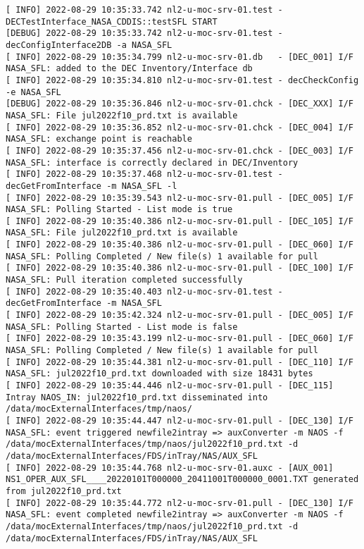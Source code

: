 \documentclass[dec_sum_main.tex]{subfiles}
\begin{document}
\begin{Verbatim}[fontsize=\tiny]
[ INFO] 2022-08-29 10:35:33.742 nl2-u-moc-srv-01.test - DECTestInterface_NASA_CDDIS::testSFL START
[DEBUG] 2022-08-29 10:35:33.742 nl2-u-moc-srv-01.test - decConfigInterface2DB -a NASA_SFL
[ INFO] 2022-08-29 10:35:34.799 nl2-u-moc-srv-01.db   - [DEC_001] I/F NASA_SFL: added to the DEC Inventory/Interface db
[ INFO] 2022-08-29 10:35:34.810 nl2-u-moc-srv-01.test - decCheckConfig -e NASA_SFL
[DEBUG] 2022-08-29 10:35:36.846 nl2-u-moc-srv-01.chck - [DEC_XXX] I/F NASA_SFL: File jul2022f10_prd.txt is available
[ INFO] 2022-08-29 10:35:36.852 nl2-u-moc-srv-01.chck - [DEC_004] I/F NASA_SFL: exchange point is reachable
[ INFO] 2022-08-29 10:35:37.456 nl2-u-moc-srv-01.chck - [DEC_003] I/F NASA_SFL: interface is correctly declared in DEC/Inventory
[ INFO] 2022-08-29 10:35:37.468 nl2-u-moc-srv-01.test - decGetFromInterface -m NASA_SFL -l
[ INFO] 2022-08-29 10:35:39.543 nl2-u-moc-srv-01.pull - [DEC_005] I/F NASA_SFL: Polling Started - List mode is true
[ INFO] 2022-08-29 10:35:40.386 nl2-u-moc-srv-01.pull - [DEC_105] I/F NASA_SFL: File jul2022f10_prd.txt is available
[ INFO] 2022-08-29 10:35:40.386 nl2-u-moc-srv-01.pull - [DEC_060] I/F NASA_SFL: Polling Completed / New file(s) 1 available for pull
[ INFO] 2022-08-29 10:35:40.386 nl2-u-moc-srv-01.pull - [DEC_100] I/F NASA_SFL: Pull iteration completed successfully
[ INFO] 2022-08-29 10:35:40.403 nl2-u-moc-srv-01.test - decGetFromInterface -m NASA_SFL
[ INFO] 2022-08-29 10:35:42.324 nl2-u-moc-srv-01.pull - [DEC_005] I/F NASA_SFL: Polling Started - List mode is false
[ INFO] 2022-08-29 10:35:43.199 nl2-u-moc-srv-01.pull - [DEC_060] I/F NASA_SFL: Polling Completed / New file(s) 1 available for pull
[ INFO] 2022-08-29 10:35:44.381 nl2-u-moc-srv-01.pull - [DEC_110] I/F NASA_SFL: jul2022f10_prd.txt downloaded with size 18431 bytes
[ INFO] 2022-08-29 10:35:44.446 nl2-u-moc-srv-01.pull - [DEC_115] Intray NAOS_IN: jul2022f10_prd.txt disseminated into /data/mocExternalInterfaces/tmp/naos/
[ INFO] 2022-08-29 10:35:44.447 nl2-u-moc-srv-01.pull - [DEC_130] I/F NASA_SFL: event triggered newfile2intray => auxConverter -m NAOS -f /data/mocExternalInterfaces/tmp/naos/jul2022f10_prd.txt -d /data/mocExternalInterfaces/FDS/inTray/NAS/AUX_SFL
[ INFO] 2022-08-29 10:35:44.768 nl2-u-moc-srv-01.auxc - [AUX_001] NS1_OPER_AUX_SFL____20220101T000000_20411001T000000_0001.TXT generated from jul2022f10_prd.txt
[ INFO] 2022-08-29 10:35:44.772 nl2-u-moc-srv-01.pull - [DEC_130] I/F NASA_SFL: event completed newfile2intray => auxConverter -m NAOS -f /data/mocExternalInterfaces/tmp/naos/jul2022f10_prd.txt -d /data/mocExternalInterfaces/FDS/inTray/NAS/AUX_SFL

\end{Verbatim}
\end{document}
